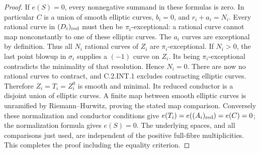 \begin{proof}
If $e(S)=0$, every nonnegative summand in these
formulas is zero. In particular $C$ is a
union of smooth elliptic curves, $b_i=0$,
and $r_i+a_i=N_i$. Every rational curve in
$(D_i)_{\rm red}$ must then be $\pi_i$-exceptional:
a rational curve cannot map nonconstantly to
one of these elliptic curves. The $a_i$ curves
are exceptional by definition. Thus all $N_i$
rational curves of $Z_i$ are $\pi_i$-exceptional.
If $N_i>0$, the last point blowup in
$\sigma_i$ supplies a $(-1)$ curve on $Z_i$.
Its being $\pi_i$-exceptional contradicts the
minimality of that resolution. Hence $N_i=0$.
There are now no rational curves to contract,
and C.2.INT.1 excludes contracting elliptic
curves. Therefore $Z_i=T_i=Z_i^0$ is smooth
and minimal. Its reduced conductor is a
disjoint union of elliptic curves. A finite
map between smooth elliptic curves is
unramified by Riemann--Hurwitz, proving the
stated map comparison.
Conversely these normalization and conductor
conditions give $e(T_i)=e((A_i)_{\rm red})=e(C)=0$;
the normalization formula gives $e(S)=0$.
The underlying spaces, and all comparisons
just used, are independent of the positive
full-fibre multiplicities. This completes the
proof including the equality criterion.
\end{proof}
